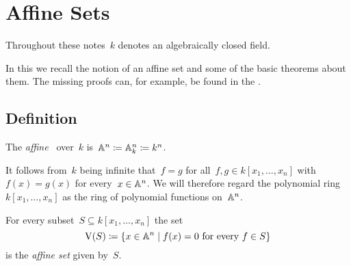 \section{Affine Sets}
\label{affine sets}


\begin{conventions}
  Throughout these notes~$k$ denotes an algebraically closed field.
\end{conventions}


\begin{fluff}
  In this  we recall the notion of an affine set and some of the basic theorems about them.
  The missing proofs can, for example, be found in the \cite{algebra1notes}.
\end{fluff}





\subsection{Definition}


\begin{definition}
  The \emph{affine~} over~$k$ is~$\mathbb{A}^n \coloneqq \mathbb{A}^n_k \coloneqq k^n$.
\end{definition}


\begin{fluff}
  It follows from~$k$ being infinite that~$f = g$ for all~$f, g \in k[x_1, \dotsc, x_n]$ with~$f(x) = g(x)$ for every~$x \in \mathbb{A}^n$.
  We will therefore regard the polynomial ring~$k[x_1, \dotsc, x_n]$ as the ring of polynomial functions on~$\mathbb{A}^n$.
\end{fluff}


\begin{definition}
  \label{definition of affine sets}
  For every subset~$S \subseteq k[x_1, \dotsc, x_n]$ the set
  \[
              \vset(S)
    \defined  \{
                x \in \Aff^n
              \suchthat
                \text{$f(x) = 0$ for every~$f \in S$}
              \}
  \]
  is the \emph{affine set} given by~$S$.
\end{definition}


